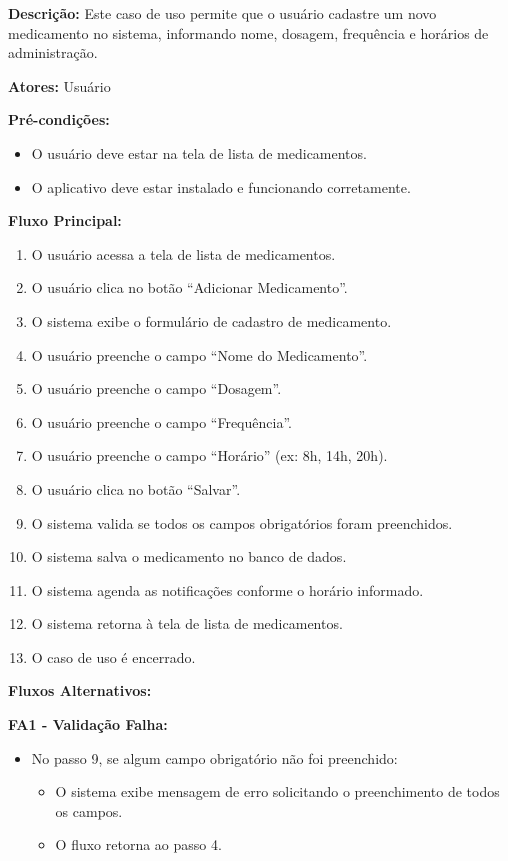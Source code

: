 \documentclass[12pt]{article}
\begin{document}
\textbf{Descrição:} Este caso de uso permite que o usuário cadastre um novo medicamento no sistema, informando nome, dosagem, frequência e horários de administração.

\textbf{Atores:} Usuário

\textbf{Pré-condições:}
\begin{itemize}
    \item O usuário deve estar na tela de lista de medicamentos.
    \item O aplicativo deve estar instalado e funcionando corretamente.
\end{itemize}

\textbf{Fluxo Principal:}
\begin{enumerate}
    \item O usuário acessa a tela de lista de medicamentos.
    \item O usuário clica no botão ``Adicionar Medicamento''.
    \item O sistema exibe o formulário de cadastro de medicamento.
    \item O usuário preenche o campo ``Nome do Medicamento''.
    \item O usuário preenche o campo ``Dosagem''.
    \item O usuário preenche o campo ``Frequência''.
    \item O usuário preenche o campo ``Horário'' (ex: 8h, 14h, 20h).
    \item O usuário clica no botão ``Salvar''.
    \item O sistema valida se todos os campos obrigatórios foram preenchidos.
    \item O sistema salva o medicamento no banco de dados.
    \item O sistema agenda as notificações conforme o horário informado.
    \item O sistema retorna à tela de lista de medicamentos.
    \item O caso de uso é encerrado.
\end{enumerate}

\textbf{Fluxos Alternativos:}

\textbf{FA1 - Validação Falha:}
\begin{itemize}
    \item No passo 9, se algum campo obrigatório não foi preenchido:
    \begin{itemize}
        \item O sistema exibe mensagem de erro solicitando o preenchimento de todos os campos.
        \item O fluxo retorna ao passo 4.
    \end{itemize}
\end{itemize}
\end{document}

